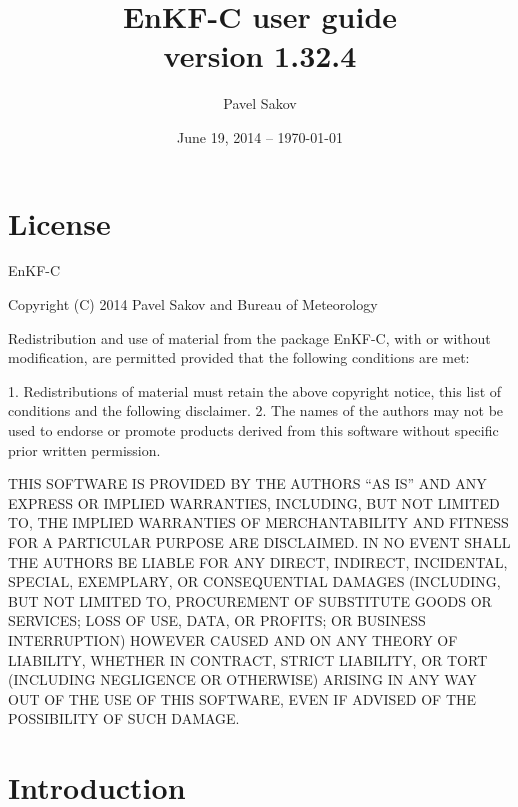 \documentclass[11pt]{report}
\begin{document}
\title{EnKF-C user guide\\{\normalsize version 1.32.4}}

\author{Pavel Sakov}
\date{June 19, 2014 -- \today}

\maketitle
\thispagestyle{empty}

\clearpage

\tableofcontents

\clearpage

\chapter*{License}

EnKF-C

Copyright (C) 2014 Pavel Sakov and Bureau of Meteorology

Redistribution and use of material from the package EnKF-C, with or without
modification, are permitted provided that the following conditions are 
met:

   1. Redistributions of material must retain the above copyright notice, this
      list of conditions and the following disclaimer.
   2. The names of the authors may not be used to endorse or promote products
      derived from this software without specific prior written permission.

THIS SOFTWARE IS PROVIDED BY THE AUTHORS ``AS IS'' AND ANY EXPRESS OR IMPLIED 
WARRANTIES, INCLUDING, BUT NOT LIMITED TO, THE IMPLIED WARRANTIES OF
MERCHANTABILITY AND FITNESS FOR A PARTICULAR PURPOSE ARE DISCLAIMED. IN NO
EVENT SHALL THE AUTHORS BE LIABLE FOR ANY DIRECT, INDIRECT, INCIDENTAL, SPECIAL,
EXEMPLARY, OR CONSEQUENTIAL DAMAGES (INCLUDING, BUT NOT LIMITED TO, PROCUREMENT
OF SUBSTITUTE GOODS OR SERVICES; LOSS OF USE, DATA, OR PROFITS; OR BUSINESS
INTERRUPTION) HOWEVER CAUSED AND ON ANY THEORY OF LIABILITY, WHETHER IN
CONTRACT, STRICT LIABILITY, OR TORT (INCLUDING NEGLIGENCE OR OTHERWISE) ARISING
IN ANY WAY OUT OF THE USE OF THIS SOFTWARE, EVEN IF ADVISED OF THE POSSIBILITY
OF SUCH DAMAGE.

\chapter*{Introduction}
\end{document}
